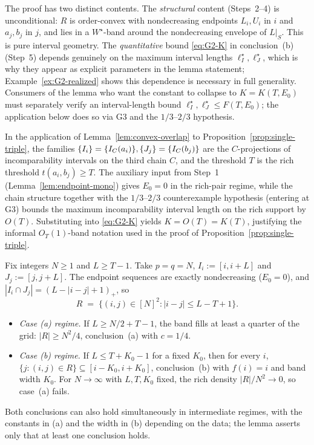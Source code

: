 \begin{remark}\label{rem:G2-structural}
The proof has two distinct contents. The \emph{structural} content
(Steps~2--4) is unconditional: $R$ is order-convex with nondecreasing endpoints
$L_i,U_i$ in $i$ and $a_j,b_j$ in $j$, and lies in a $W^\star$-band around the nondecreasing
envelope of $L\big|_S$. This is pure interval geometry. The \emph{quantitative} bound
\eqref{eq:G2-K} in conclusion~(b) (Step~5) depends genuinely on the maximum interval lengths
$\ell_I^\star,\ell_J^\star$, which is why they appear as explicit parameters in the lemma
statement; Example~\ref{ex:G2-realized} shows this dependence is necessary in full generality.
Consumers of the lemma who want the constant to collapse to $K=K(T,E_0)$ must separately
verify an interval-length bound $\ell_I^\star,\ell_J^\star\le F(T,E_0)$; the application
below does so via G3 and the $1/3$--$2/3$ hypothesis.
\end{remark}

\begin{remark}\label{rem:G2-application}
In the application of Lemma~\ref{lem:convex-overlap} to Proposition~\ref{prop:single-triple},
the families $\{I_i\}=\{I_C(a_i)\},\{J_j\}=\{I_C(b_j)\}$ are the $C$-projections of
incomparability intervals on the third chain $C$, and the threshold $T$ is the rich
threshold $t(a_i,b_j)\ge T$. The auxiliary input from Step~1 (Lemma~\ref{lem:endpoint-mono})
gives $E_0=0$ in the rich-pair regime, while the chain structure together with the
$1/3$--$2/3$ counterexample hypothesis (entering at G3) bounds the maximum incomparability
interval length on the rich support by $O(T)$. Substituting into \eqref{eq:G2-K} yields
$K=O(T)=K(T)$, justifying the informal $O_T(1)$-band notation used in the proof of
Proposition~\ref{prop:single-triple}.
\end{remark}

\begin{example}\label{ex:G2-realized}
Fix integers $N\ge 1$ and $L\ge T-1$. Take $p=q=N$, $I_i:=[i,i+L]$ and $J_j:=[j,j+L]$.
The endpoint sequences are exactly nondecreasing ($E_0=0$), and
$|I_i\cap J_j|=(L-|i-j|+1)_+$, so
\[
R\;=\;\{(i,j)\in[N]^2 : |i-j|\le L-T+1\}.
\]
\begin{itemize}[nosep]
\item \emph{Case (a) regime.} If $L\ge N/2+T-1$, the band fills at least a quarter of
the grid: $|R|\ge N^2/4$, conclusion~(a) with $c=1/4$.
\item \emph{Case (b) regime.} If $L\le T+K_0-1$ for a fixed $K_0$, then for every $i$,
$\{j:(i,j)\in R\}\subseteq[i-K_0,i+K_0]$, conclusion~(b) with $f(i)=i$ and band width $K_0$.
For $N\to\infty$ with $L,T,K_0$ fixed, the rich density $|R|/N^2\to 0$, so case~(a) fails.
\end{itemize}
Both conclusions can also hold simultaneously in intermediate regimes, with the
constants in (a) and the width in (b) depending on the data; the lemma asserts only that
at least one conclusion holds.
\end{example}

